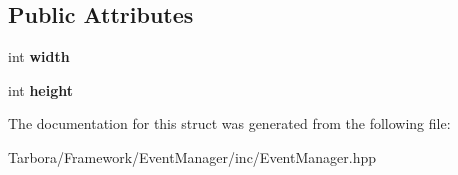 \subsection*{Public Attributes}
\begin{DoxyCompactItemize}
\item 
\mbox{\label{structTarbora_1_1WindowResizeEvent_a68fd2c714fe61d3ff5dcac6c61a9253d}} 
int {\bfseries width}
\item 
\mbox{\label{structTarbora_1_1WindowResizeEvent_aa4c443dad3c0d021948c7642a39984ac}} 
int {\bfseries height}
\end{DoxyCompactItemize}


The documentation for this struct was generated from the following file\+:\begin{DoxyCompactItemize}
\item 
Tarbora/\+Framework/\+Event\+Manager/inc/Event\+Manager.\+hpp\end{DoxyCompactItemize}

